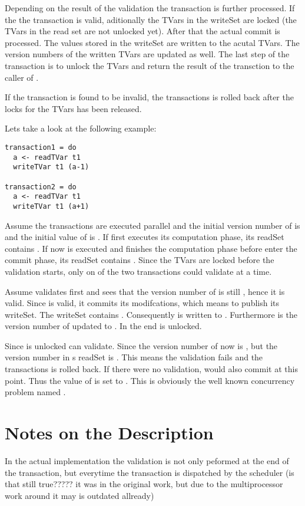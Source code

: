 Depending on the result of the validation the transaction is further processed. If the the transaction is valid, aditionally the
TVars in the writeSet are locked (the TVars in the read set are not unlocked yet). After that the actual commit is processed. 
The values stored in the writeSet are written to the acutal TVars. The version numbers of the written TVars are updated as well.
The last step of the transaction is to unlock the TVars and return the result of the transction to the caller of .

If the transaction is found to be invalid, the transactions is rolled back after the locks for the TVars has been released.


Lets take a look at the following example:
\begin{lstlisting}
transaction1 = do 
  a <- readTVar t1
  writeTVar t1 (a-1)
  
transaction2 = do 
  a <- readTVar t1
  writeTVar t1 (a+1)
\end{lstlisting}
Assume the transactions are executed parallel and the initial version number of  is  and the initial value of  is .
If  first executes its computation phase, its readSet contains . 
If now  is executed and finishes the computation phase before  enter the commit phase,
its readSet contains . Since the TVars are locked before the validation starts, only on 
of the two transactions could validate at a time. 

Assume  validates first and sees that the version number of 
is still , hence it is valid. Since  is valid, it commits its modifcations, which means to publish its writeSet.
The writeSet contains .  Consequently  is written to . Furthermore is the version number of  updated
to . In the end  is unlocked. 

Since  is unlocked  can validate. Since the version number of  now is , but the version
number in s readSet is . This means the validation fails and the transactions is rolled back. If there were 
no validation,  would also commit at this point. Thus the value of  is set to . This is obviously
the well known concurrency problem named . 


\section{Notes on the Description}
In the actual implementation the validation is not only peformed at the end of the transaction, but everytime the transaction is 
dispatched by the scheduler (is that still true????? it was in the original work, but due to the multiprocessor work around it may
is outdated allready)


